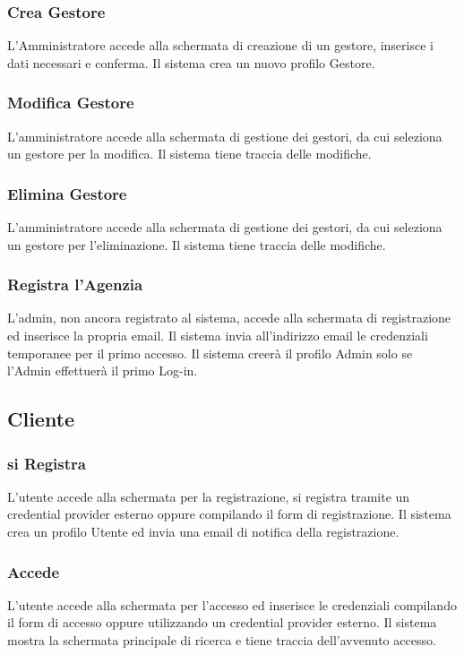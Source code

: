 \subsubsection{Crea Gestore}
L'Amministratore accede alla schermata di creazione di un gestore, 
inserisce i dati necessari e conferma. Il sistema crea un nuovo profilo Gestore.

\subsubsection{Modifica Gestore}
L'amministratore accede alla schermata di gestione dei gestori, da cui 
seleziona un gestore per la modifica. Il sistema tiene traccia delle
modifiche.

\subsubsection{Elimina Gestore}
L'amministratore accede alla schermata di gestione dei gestori, da cui 
seleziona un gestore per l'eliminazione. Il sistema tiene traccia delle
modifiche.

\subsubsection{Registra l'Agenzia}
L'admin, non ancora registrato al sistema, accede alla schermata di registrazione 
ed inserisce la propria email. Il sistema invia all'indirizzo email le credenziali 
temporanee per il primo accesso. Il sistema creerà il profilo Admin solo se l'Admin 
effettuerà il primo Log-in.

\subsection{Cliente}
\subsubsection{si Registra}
L'utente accede alla schermata per la registrazione, si registra tramite 
un credential provider esterno oppure compilando il form di registrazione. 
Il sistema crea un profilo Utente ed invia una email di notifica 
della registrazione.

\subsubsection{Accede}
L'utente accede alla schermata per l'accesso ed inserisce le credenziali 
compilando il form di accesso oppure utilizzando un credential provider esterno. 
Il sistema mostra la schermata principale di ricerca e tiene traccia 
dell'avvenuto accesso.


